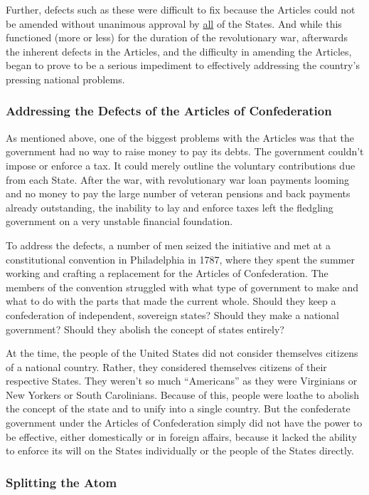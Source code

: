 Further, defects such as these were difficult to fix because the Articles could not be amended without unanimous approval by \underline{all} of the States.  And while this functioned (more or less) for the duration of the revolutionary war, afterwards the inherent defects in the Articles, and the difficulty in amending the Articles, began to prove to be a serious impediment to effectively addressing the country's pressing national problems.

\subsubsection{Addressing the Defects of the Articles of Confederation}
As mentioned above, one of the biggest problems with the Articles was that the government had no way to raise money to pay its debts.  The government couldn't impose or enforce a tax.  It could merely outline the voluntary contributions due from each State.  After the war, with revolutionary war loan payments looming and no money to pay the large number of veteran pensions and back payments already outstanding, the inability to lay and enforce taxes left the fledgling government on a very unstable financial foundation.  

To address the defects, a number of men seized the initiative and met at a constitutional convention in Philadelphia in 1787, where they spent the summer working and crafting a replacement for the Articles of Confederation.  The members of the convention struggled with what type of government to make and what to do with the parts that made the current whole.  Should they keep a confederation of independent, sovereign states?  Should they make a national government?  Should they abolish the concept of states entirely?

At the time, the people of the United States did not consider themselves citizens of a national country.  Rather, they considered themselves citizens of their respective States.  They weren't so much ``Americans'' as they were Virginians or New Yorkers or South Carolinians.  Because of this, people were loathe to abolish the concept of the state and to unify into a single country.  But the confederate government under the Articles of Confederation simply did not have the power to be effective, either domestically or in foreign affairs, because it lacked the ability to enforce its will on the States individually or the people of the States directly.  

\subsubsection{Splitting the Atom}


